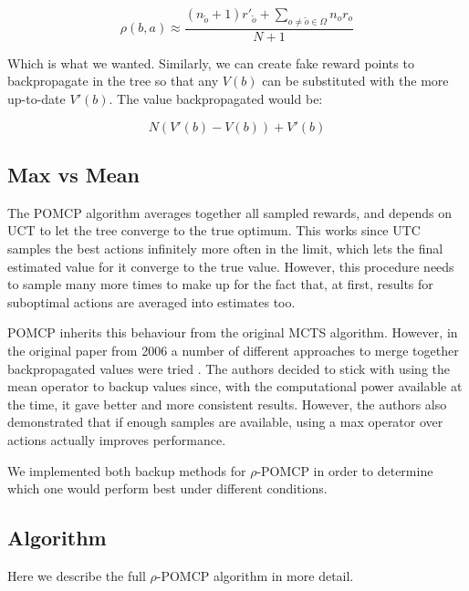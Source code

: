 \[ \rho(b,a) \approx \frac{ ( n_{\tilde{o}}+1) r'_{\tilde{o}} +
\sum_{o \neq \tilde{o} \in \Omega} n_o r_o}{N+1} \]

Which is what we wanted. Similarly, we can create fake reward points to backpropagate in the tree so
that any $V(b)$ can be substituted with the more up-to-date $V'(b)$. The value backpropagated would be:

\[ N ( V'(b) - V(b) ) + V'(b) \]

\subsection{Max vs Mean}

The POMCP algorithm averages together all sampled rewards, and depends on UCT to let the tree
converge to the true optimum. This works since UTC samples the best actions infinitely more often in
the limit, which lets the final estimated value for it converge to the true value. However, this
procedure needs to sample many more times to make up for the fact that, at first, results for
suboptimal actions are averaged into estimates too.

POMCP inherits this behaviour from the original MCTS algorithm. However, in the original paper from
2006 a number of different approaches to merge together backpropagated values were tried
\cite{cit:mcts}. The authors decided to stick with using the mean operator to backup values since,
with the computational power available at the time, it gave better and more consistent results.
However, the authors also demonstrated that if enough samples are available, using a max operator
over actions actually improves performance.

We implemented both backup methods for $\rho$-POMCP in order to determine which one would perform
best under different conditions.

\subsection{Algorithm}

Here we describe the full $\rho$-POMCP algorithm in more detail.

